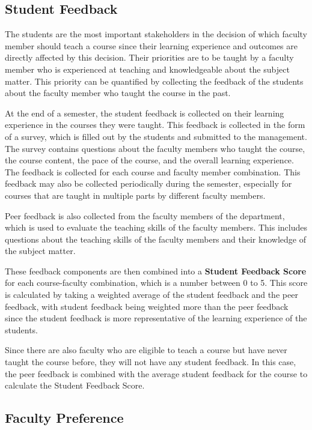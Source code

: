 \subsection{Student Feedback}

The students are the most important stakeholders in the decision of which faculty member should teach a course since their learning experience and outcomes are directly affected by this decision. Their priorities are to be taught by a faculty member who is experienced at teaching and knowledgeable about the subject matter. This priority can be quantified by collecting the feedback of the students about the faculty member who taught the course in the past.

At the end of a semester, the student feedback is collected on their learning experience in the courses they were taught. This feedback is collected in the form of a survey, which is filled out by the students and submitted to the management. The survey contains questions about the faculty members who taught the course, the course content, the pace of the course, and the overall learning experience. The feedback is collected for each course and faculty member combination. This feedback may also be collected periodically during the semester, especially for courses that are taught in multiple parts by different faculty members.

Peer feedback is also collected from the faculty members of the department, which is used to evaluate the teaching skills of the faculty members. This includes questions about the teaching skills of the faculty members and their knowledge of the subject matter.

These feedback components are then combined into a \textbf{Student Feedback Score} for each course-faculty combination, which is a number between 0 to 5. This score is calculated by taking a weighted average of the student feedback and the peer feedback, with student feedback being weighted more than the peer feedback since the student feedback is more representative of the learning experience of the students.

Since there are also faculty who are eligible to teach a course but have never taught the course before, they will not have any student feedback. In this case, the peer feedback is combined with the average student feedback for the course to calculate the Student Feedback Score.

\subsection{Faculty Preference}

